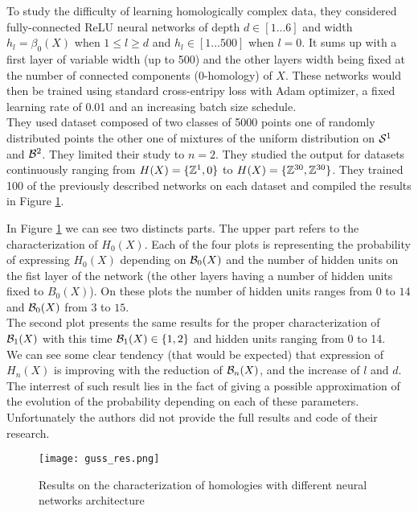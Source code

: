 \documentclass[12pt, a4paper]{article}
\begin{document}
To study the difficulty of learning homologically complex data, they considered fully-connected ReLU neural networks of depth $d \in [1 ... 6]$ and width $h_l = \beta_0(X)$ when $1 \le l \ge d$ and $h_l \in [1 ... 500]$ when $l = 0$. It sums up with a first layer of variable width (up to 500) and the other layers width being fixed at the number of connected components (0-homology) of $X$. These networks would then be trained using standard cross-entripy loss with Adam optimizer, a fixed learning rate of 0.01 and an increasing batch size schedule.\\

They used dataset composed of two classes of 5000 points one of randomly distributed points the other one of mixtures of the uniform distribution on $\S^1$ and $\B^2$. They limited their study to $n=2$. They studied the output for datasets continuously ranging from $H(X) = \{\Z^1, 0\}$ to $H(X) = \{\Z^{30}, \Z^{30}\}$. They trained 100 of the previously described networks on each dataset and compiled the results in Figure \ref{fig:guss_results}.


In Figure \ref{fig:guss_results} we can see two distincts parts. The upper part refers to the characterization of $H_0(X)$. Each of the four plots is representing the probability of expressing $H_0(X)$ depending on $\B_0(X)$ and the number of hidden units on the fist layer of the network (the other layers having a number of hidden units fixed to $B_0(X)$). On these plots the number of hidden units ranges from $0$ to $14$ and $\B_0(X)$ from $3$ to $15$.\\

The second plot presents the same results for the proper characterization of $\B_1(X)$ with this time $\B_1(X) \in \{1,2\}$ and hidden units ranging from $0$ to 14.\\

We can see some clear tendency (that would be expected) that expression of $H_n(X)$ is improving with the reduction of $\B_n(X)$, and the increase of $l$ and $d$. The interrest of such result lies in the fact of giving a possible approximation of the evolution of the probability depending on each of these parameters.\\

Unfortunately the authors did not provide the full results and code of their research.

\begin{figure}[H]
  \centering
  \texttt{[image: guss\_res.png]}
  \caption{Results on the characterization of homologies with different neural networks architecture}
  \label{fig:guss_results}
  
\end{figure}
\newpage
\end{document}
